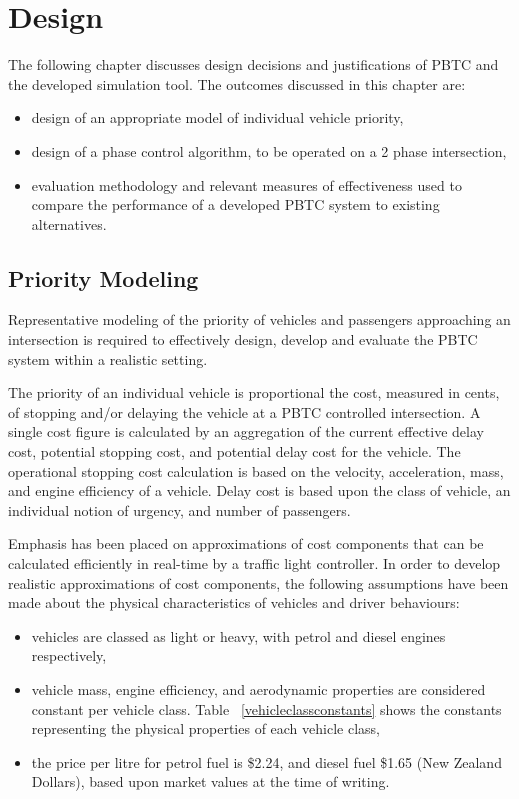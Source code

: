 \chapter{Design}

The following chapter discusses design decisions and justifications of PBTC and the developed simulation tool. The outcomes discussed in this chapter are:

\begin{itemize}
\item design of an appropriate model of individual vehicle priority,
\item design of a phase control algorithm, to be operated on a 2 phase intersection,
\item evaluation methodology and relevant measures of effectiveness used to compare the performance of a developed PBTC system to existing alternatives.
\end{itemize}

\section{Priority Modeling}

Representative modeling of the priority of vehicles and passengers approaching an intersection is required to effectively design, develop and evaluate the PBTC system within a realistic setting. 

The priority of an individual vehicle is proportional the cost, measured in cents, of stopping and/or delaying the vehicle at a PBTC controlled intersection. A single cost figure is calculated by an aggregation of the current effective delay cost, potential stopping cost, and potential delay cost for the vehicle. The operational stopping cost calculation is based on the velocity, acceleration, mass, and engine efficiency of a vehicle. Delay cost is based upon the class of vehicle, an individual notion of urgency, and number of passengers.

Emphasis has been placed on approximations of cost components that can be calculated efficiently in real-time by a traffic light controller. In order to develop realistic approximations of cost components, the following assumptions have been made about the physical characteristics of vehicles and driver behaviours:

\begin{itemize}
\item vehicles are classed as light or heavy, with petrol and diesel engines respectively,
\item vehicle mass, engine efficiency, and aerodynamic properties are considered constant per vehicle class. Table ~\ref{vehicleclassconstants} shows the constants representing the physical properties of each vehicle class,
\item the price per litre for petrol fuel is \$2.24, and diesel fuel \$1.65 (New Zealand Dollars), based upon market values at the time of writing.
\end{itemize}

